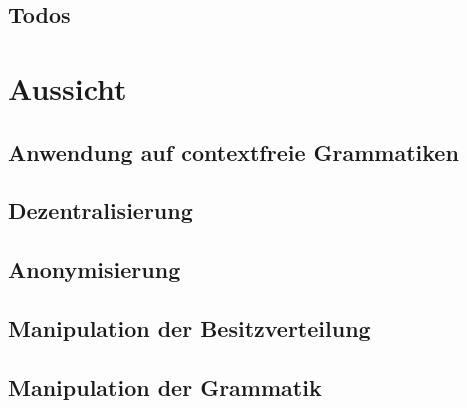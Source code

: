 \documentclass[]{article}
\begin{document}
\subsection*{Todos}

\listoftodos[Aufgaben]




\section{Aussicht}

\subsection*{Anwendung auf contextfreie Grammatiken}



\subsection*{Dezentralisierung}

\subsection*{Anonymisierung}

\subsection*{Manipulation der Besitzverteilung}
\subsection*{Manipulation der Grammatik}
\end{document}
